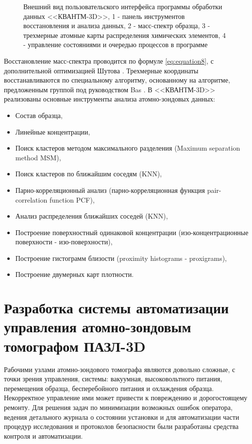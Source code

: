 \begin{figure}[htb]
	\caption{Внешний вид пользовательского интерфейса программы обработки данных <<КВАНТМ-3D>>, 1 - панель инструментов восстановления и анализа данных, 2 - масс-спектр образца, 3 - трехмерные атомные карты распределения химических элементов, 4 - управление состояниями и очередью процессов в программе}
	\label{fig:APPLE_kvant}
\end{figure}

Восстановление масс-спектра проводится по формуле \cref{eq:equation8}, с дополнительной оптимизацией Шутова \cite{Shutov19}. Трехмерные координаты восстанавливаются по специальному алгоритму, основанному на алгоритме, предложенным группой под руководством Bas \cite{Bas95}. В <<КВАНТМ-3D>> реализованы основные инструменты анализа атомно-зондовых данных:

\begin{itemize}
	\item Состав образца,
	\item Линейные концентрации,
	\item Поиск кластеров методом максимального разделения (Maximum separation method MSM),
	\item Поиск кластеров по ближайшим соседям (KNN),
	\item Парно-корреляционный анализ (парно-корреляционная функция pair-correlation function PCF),
	\item Анализ распределения ближайших соседей (KNN),
	\item Построение поверхностный одинаковой концентрации (изо-концентрационные поверхности - изо-поверхности),
	\item Построение гистограмм близости (proximity histograms - proxigrams),
	\item Построение двумерных карт плотности.
\end{itemize}

\FloatBarrier
\section{Разработка системы автоматизации управления атомно-зондовым томографом ПАЗЛ-3D}\label{sec:ch2/sec6}

Рабочими узлами атомно-зондового томографа являются довольно сложные, с точки зрения управления, системы: вакуумная, высоковольтного питания, перемещения образца, бесперебойного питания и охлаждения образца. Некорректное управление ими может привести к повреждению и дорогостоящему ремонту. Для решения задач по минимизации возможных ошибок оператора, ведения детального журнала о состоянии установки и для автоматизации части процедур исследования и протоколов безопасности были разработаны средства контроля и автоматизации. 

